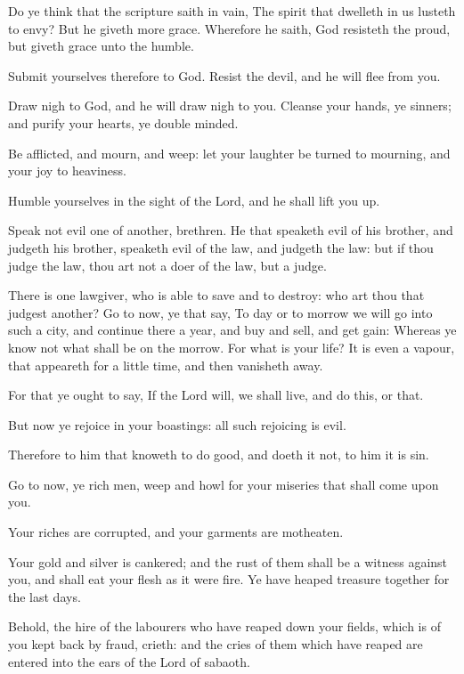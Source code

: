 \Verse Do ye think that the scripture saith in vain, The spirit that dwelleth in us lusteth to envy?  \Verse But he giveth more grace.  Wherefore he saith, God resisteth the proud, but giveth grace unto the humble.

\Verse Submit yourselves therefore to God. Resist the devil, and he will flee from you.

\Verse Draw nigh to God, and he will draw nigh to you. Cleanse your hands, ye sinners; and purify your hearts, ye double minded.

\Verse Be afflicted, and mourn, and weep: let your laughter be turned to mourning, and your joy to heaviness.

\Verse Humble yourselves in the sight of the Lord, and he shall lift you up.

\Verse Speak not evil one of another, brethren. He that speaketh evil of his brother, and judgeth his brother, speaketh evil of the law, and judgeth the law: but if thou judge the law, thou art not a doer of the law, but a judge.

\Verse There is one lawgiver, who is able to save and to destroy: who art thou that judgest another?  \Verse Go to now, ye that say, To day or to morrow we will go into such a city, and continue there a year, and buy and sell, and get gain: \Verse Whereas ye know not what shall be on the morrow. For what is your life? It is even a vapour, that appeareth for a little time, and then vanisheth away.

\Verse For that ye ought to say, If the Lord will, we shall live, and do this, or that.

\Verse But now ye rejoice in your boastings: all such rejoicing is evil.

\Verse Therefore to him that knoweth to do good, and doeth it not, to him it is sin.


\Chapter
\Verse Go to now, ye rich men, weep and howl for your miseries that shall come upon you.

\Verse Your riches are corrupted, and your garments are motheaten.

\Verse Your gold and silver is cankered; and the rust of them shall be a witness against you, and shall eat your flesh as it were fire. Ye have heaped treasure together for the last days.

\Verse Behold, the hire of the labourers who have reaped down your fields, which is of you kept back by fraud, crieth: and the cries of them which have reaped are entered into the ears of the Lord of sabaoth.

